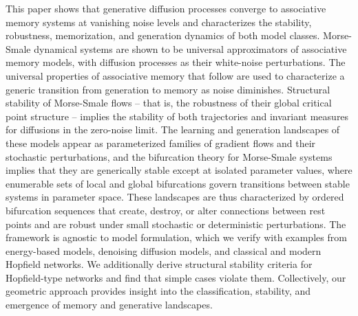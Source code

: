 \documentclass[12pt]{article}
\begin{document}
This paper shows that generative diffusion processes converge to associative memory systems at vanishing noise levels and characterizes the stability, robustness, memorization, and generation dynamics of both model classes. Morse-Smale dynamical systems are shown to be universal approximators of associative memory models, with diffusion processes as their white-noise perturbations. The universal properties of associative memory that follow are used to characterize a generic transition from generation to memory as noise diminishes. Structural stability of Morse-Smale flows -- that is, the robustness of their global critical point structure -- implies the stability of both trajectories and invariant measures for diffusions in the zero-noise limit. The learning and generation landscapes of these models appear as parameterized families of gradient flows and their stochastic perturbations, and the bifurcation theory for Morse-Smale systems implies that they are generically stable except at isolated parameter values, where enumerable sets of local and global bifurcations govern transitions between stable systems in parameter space. These landscapes are thus characterized by ordered bifurcation sequences that create, destroy, or alter connections between rest points and are robust under small stochastic or deterministic perturbations. The framework is agnostic to model formulation, which we verify with examples from energy-based models, denoising diffusion models, and classical and modern Hopfield networks. We additionally derive structural stability criteria for Hopfield-type networks and find that simple cases violate them. Collectively, our geometric approach provides insight into the classification, stability, and emergence of memory and generative landscapes.
\end{document}
